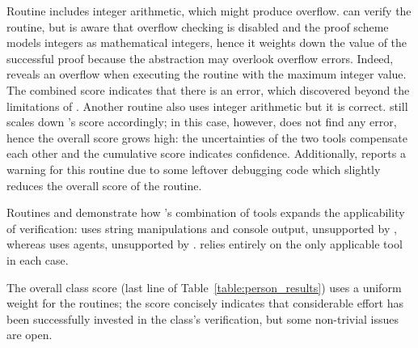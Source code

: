 Routine  includes integer arithmetic, which might produce overflow. 
\AutoProof can verify the routine, but \EVE is aware that overflow checking is disabled and the proof scheme models integers as mathematical integers, hence it weights down the value of the successful proof because the abstraction may overlook overflow errors.
Indeed, \AutoTest reveals an overflow when executing the routine with the maximum integer value. 
The combined score indicates that there is an error, which \AutoTest discovered beyond the limitations of \AutoProof. 
Another routine  also uses integer arithmetic but it is correct.
\EVE still scales down \AutoProof's score accordingly; in this case, however, \AutoTest does not find any error, hence the overall score grows high: the uncertainties of the two tools compensate each other and the cumulative score indicates confidence.
Additionally, \Inspector reports a warning for this routine due to some leftover debugging code which slightly reduces the overall score of the routine.

Routines  and  demonstrate how \EVE's combination of tools expands the applicability of verification:  uses string manipulations and console output, unsupported by \AutoProof, whereas  uses agents, unsupported by \AutoTest. \EVE relies entirely on the only applicable tool in each case.


The overall class score (last line of Table~\ref{table:person_results}) uses a uniform weight for the routines; the score concisely indicates that considerable effort has been successfully invested in the class's verification, but some non-trivial issues are open. 
